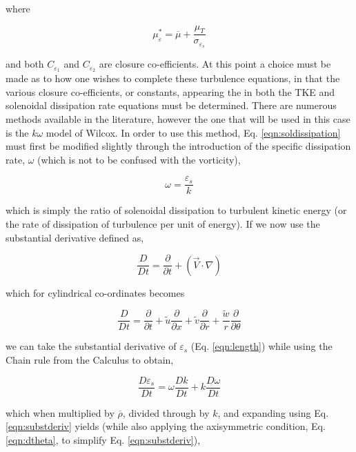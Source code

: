 	where

\begin{equation}
	\mu_\varepsilon^* = \overline{\mu} + \frac{\mu_T}{\sigma_{\varepsilon_s}} 
\label{eqn:muepsilonstar}
\end{equation}

	and both $C_{\varepsilon_1}$ and $C_{\varepsilon_2}$ are closure co-efficients.  At this point a choice must be made 
as to how one wishes to complete these turbulence equations, in that the various closure co-efficients, or constants, appearing 
the in both the TKE and solenoidal dissipation rate equations must be determined.  There are numerous methods available in the 
literature, however the one that will be used in this case is the $k\omega$ model of Wilcox.  In order to use 
this method, Eq. \ref{eqn:soldissipation} must first be modified slightly through the introduction of the specific dissipation 
rate, $\omega$ (which is not to be confused with the vorticity),

\begin{equation}
	\omega = \frac{\varepsilon_s}{k} 
\label{eqn:length}
\end{equation}

	which is simply the ratio of solenoidal dissipation to turbulent kinetic energy (or the rate of dissipation of turbulence
per unit of energy).  If we now use the substantial derivative defined as,

\begin{displaymath}
	\frac{D}{Dt} = \frac{\partial}{\partial t} + (\vec{V} \cdot \nabla)
\end{displaymath}

	which for cylindrical co-ordinates becomes

\begin{equation}
	\frac{D}{Dt} = \frac{\partial}{\partial t} + \tilde u \frac{\partial}{\partial x} 
	+ \tilde v \frac{\partial}{\partial r} + \frac{\tilde w}{r}\frac{\partial}{\partial \theta}
\label{eqn:substderiv}
\end{equation}

	we can take the substantial derivative of $\varepsilon_s$ (Eq. \ref{eqn:length}) while using the Chain rule from the 
Calculus to obtain,

\begin{displaymath}
	\frac{D\varepsilon_s}{Dt} = \omega\frac{Dk}{Dt} + k\frac{D\omega}{Dt}
\end{displaymath}

	which when multiplied by $\overline{\rho}$, divided through by $k$, and expanding using Eq. \ref{eqn:substderiv} 
yields (while also applying the axisymmetric condition, Eq. \ref{eqn:dtheta}, to simplify Eq. \ref{eqn:substderiv}),

